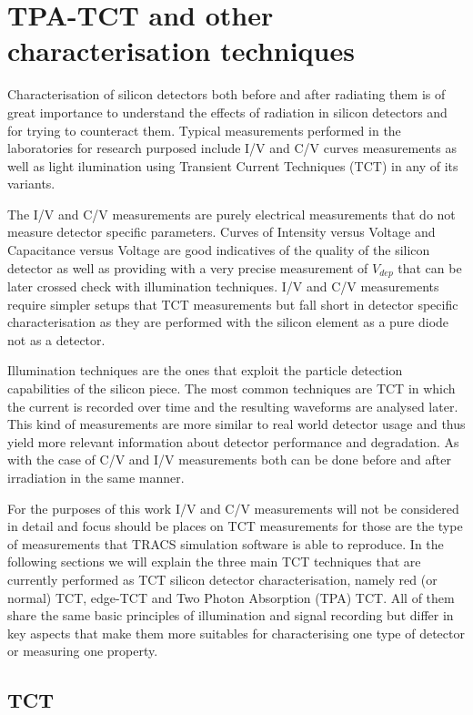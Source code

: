 \chapter{TPA-TCT and other characterisation techniques}

Characterisation of silicon detectors both before and after radiating them is of great importance to understand the effects of radiation in silicon detectors and for trying to counteract them. Typical measurements performed in the laboratories for research purposed include I/V and C/V curves measurements as well as light ilumination using Transient Current Techniques (TCT) in any of its variants. 

The I/V and C/V measurements are purely electrical measurements that do not measure detector specific parameters. Curves of Intensity versus Voltage and Capacitance versus Voltage are good indicatives of the quality of the silicon detector as well as providing with a very precise measurement of $V_{dep}$ that can be later crossed check with illumination techniques. I/V and C/V measurements require simpler setups that TCT measurements but fall short in detector specific characterisation as they are performed with the silicon element as a pure diode not as a detector.

Illumination techniques are the ones that exploit the particle detection capabilities of the silicon piece. The most common techniques are TCT in which the current is recorded over time and the resulting waveforms are analysed later. This kind of measurements are more similar to real world detector usage and thus yield more relevant information about detector performance and degradation. As with the case of C/V and I/V measurements both can be done before and after irradiation in the same manner.

For the purposes of this work I/V and C/V measurements will not be considered in detail and focus should be places on TCT measurements for those are the type of measurements that TRACS simulation software is able to reproduce. In the following sections we will explain the three main TCT techniques that are currently performed as TCT silicon detector characterisation, namely red (or normal) TCT, edge-TCT and Two Photon Absorption (TPA) TCT. All of them share the same basic principles of illumination and signal recording but differ in key aspects that make them more suitables for characterising one type of detector or measuring one property. 

\section{TCT} %
\label{sec:experimental_method}

